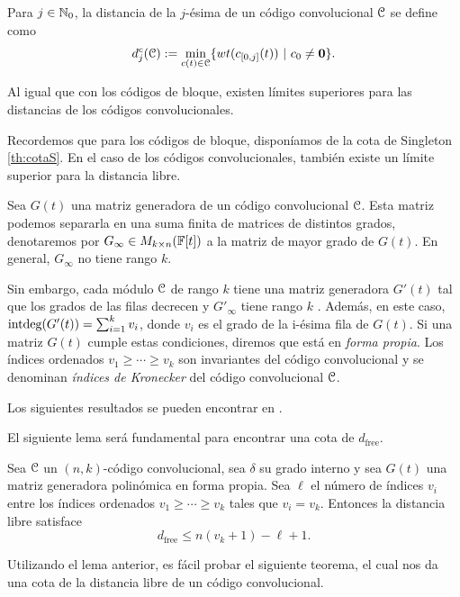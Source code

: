 \begin{definicion}
Para $j \in \mathbb{N}_0$, la distancia de la $j$-ésima de un código convolucional $\mathcal C$ se define como
$$d_j^c(\mathcal C) := \min_{c(t) \in \mathcal C} \{wt(c_{[0,j]}(t)) \ | \ c_0 \neq \mathbf{0}\}.$$
\end{definicion}

Al igual que con los códigos de bloque, existen límites superiores para las distancias de los códigos convolucionales.

Recordemos que para los códigos de bloque, disponíamos de la cota de Singleton \ref{th:cotaS}. En el caso de los códigos convolucionales, también existe un límite superior para la distancia libre.

Sea $G(t)$ una matriz generadora de un código convolucional $\mathcal C$. Esta matriz podemos separarla en una suma finita de matrices de distintos grados, denotaremos por $G_{\infty} \in M_{k \times n}(\mathbb{F}[t])$ a la matriz de mayor grado de $G(t)$. En general, $G_{\infty}$ no tiene rango $k$.

Sin embargo, cada módulo $\mathcal C$ de rango $k$  tiene una matriz generadora $G'(t)$ tal que los grados de las filas decrecen y $G'_{\infty}$ tiene rango $k$ \cite{Rosenthal1999}. Además, en este caso, $\textnormal{intdeg}(G'(t))  = \sum_{i=1}^{k} v_i$, donde $v_i$ es el grado de la i-ésima fila de $G(t)$. Si una matriz $G(t)$ cumple estas condiciones, diremos que está en \emph{forma propia}. Los índices ordenados $v_1 \geq \cdots \geq v_k$ son invariantes del código convolucional y se denominan \emph{índices de Kronecker} del código convolucional $\mathcal C$. 


Los siguientes resultados se pueden encontrar en \cite{Rosenthal1999}. 

El siguiente lema será fundamental para encontrar una cota de $d_{\text{free}}$.
\begin{lema}
Sea $\mathcal C$ un $(n,k)$-código convolucional, sea $\delta$ su grado interno y sea $G(t)$ una matriz generadora polinómica en forma propia. Sea $\ell$ el número de índices $v_i$ entre los índices ordenados $v_1 \geq \cdots \geq v_k$ tales que $v_i = v_k$. Entonces la distancia libre satisface 
\begin{equation}\label{eq:lemad}
d_{\text{free}} \leq n(v_k + 1) - \ell + 1.
\end{equation}
\end{lema}

Utilizando el lema anterior, es fácil probar el siguiente teorema, el cual nos da una cota de la distancia libre de un código convolucional.

